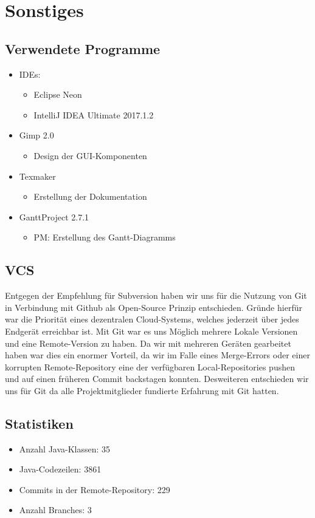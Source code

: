 \documentclass[12pt]{article}
\theoremstyle{plain}
\begin{document}
\section{Sonstiges}
\subsection{Verwendete Programme}
\begin{itemize}
\item IDEs:
\begin{itemize}
\item Eclipse Neon
\item IntelliJ IDEA Ultimate 2017.1.2
\end{itemize}
\item Gimp 2.0
\begin{itemize}
\item Design der GUI-Komponenten
\end{itemize}
\item Texmaker
\begin{itemize}
\item Erstellung der Dokumentation
\end{itemize}
\item GanttProject 2.7.1
\begin{itemize}
\item PM: Erstellung des Gantt-Diagramms
\end{itemize}
\end{itemize}



\subsection{VCS}
Entgegen der Empfehlung für Subversion haben wir uns für die Nutzung von Git in Verbindung mit Github als Open-Source Prinzip entschieden. Gründe hierfür war die Priorität eines dezentralen Cloud-Systems, welches jederzeit über jedes Endgerät erreichbar ist. Mit Git war es uns Möglich mehrere Lokale Versionen und eine Remote-Version zu haben. Da wir mit mehreren Geräten gearbeitet haben war dies ein enormer Vorteil, da wir im Falle eines Merge-Errors oder einer korrupten Remote-Repository eine der verfügbaren Local-Repositories pushen und auf einen früheren Commit backstagen konnten. Desweiteren entschieden wir uns für Git da alle Projektmitglieder fundierte Erfahrung mit Git hatten.	
\subsection{Statistiken}
\begin{itemize}
\item Anzahl Java-Klassen: 35
\item Java-Codezeilen: 3861
\item Commits in der Remote-Repository: 229
\item Anzahl Branches: 3
\end{itemize}
\end{document}
